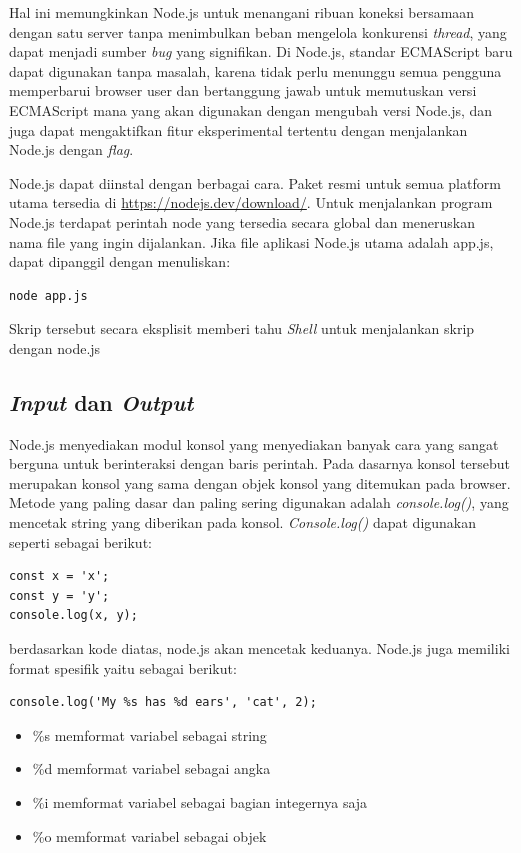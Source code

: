 Hal ini memungkinkan Node.js untuk menangani ribuan koneksi bersamaan dengan satu server tanpa menimbulkan beban mengelola konkurensi \textit{thread}, yang dapat menjadi sumber \textit{bug} yang signifikan. Di Node.js, standar ECMAScript baru dapat digunakan tanpa masalah, karena tidak perlu menunggu semua pengguna memperbarui browser user dan bertanggung jawab untuk memutuskan versi ECMAScript mana yang akan digunakan dengan mengubah versi Node.js, dan juga dapat mengaktifkan fitur eksperimental tertentu dengan menjalankan Node.js dengan \textit{flag}.

Node.js dapat diinstal dengan berbagai cara. Paket resmi untuk semua platform utama tersedia di \url{https://nodejs.dev/download/}. Untuk menjalankan program Node.js terdapat perintah node yang tersedia secara global dan meneruskan nama file yang ingin dijalankan. Jika file aplikasi Node.js utama adalah app.js, dapat dipanggil dengan menuliskan: 

     \begin{lstlisting}[basicstyle=\ttfamily, frame=single,
        columns=fullflexible, breaklines=true, numbers=none]
node app.js
    \end{lstlisting} 
    Skrip tersebut secara eksplisit memberi tahu \textit{Shell} untuk menjalankan skrip dengan node.js
    
\subsection{\textit{Input} dan \textit{Output}}
\label{sec: Input dan Output}
Node.js menyediakan modul konsol yang menyediakan banyak cara yang sangat berguna untuk berinteraksi dengan baris perintah. Pada dasarnya konsol tersebut merupakan konsol yang sama dengan objek konsol yang ditemukan pada browser. Metode yang paling dasar dan paling sering digunakan adalah \textit{console.log()}, yang mencetak string yang diberikan pada konsol. \textit{Console.log()} dapat digunakan seperti sebagai berikut: 
     \begin{lstlisting}[basicstyle=\ttfamily, frame=single,
        columns=fullflexible, breaklines=true, numbers=none]
const x = 'x';
const y = 'y';
console.log(x, y);
    \end{lstlisting} 
berdasarkan kode diatas, node.js akan mencetak keduanya. Node.js juga memiliki format spesifik yaitu sebagai berikut: 
     \begin{lstlisting}[basicstyle=\ttfamily, frame=single,
        columns=fullflexible, breaklines=true, numbers=none]
console.log('My %s has %d ears', 'cat', 2);
    \end{lstlisting}
    \begin{itemize}
        \item \%s memformat variabel sebagai string
        \item \%d memformat variabel sebagai angka
        \item \%i memformat variabel sebagai bagian integernya saja
        \item \%o memformat variabel sebagai objek
    \end{itemize}

